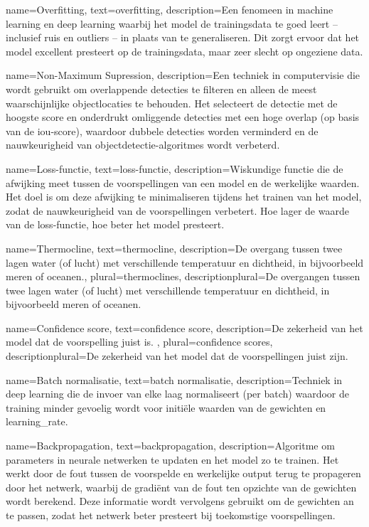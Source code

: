 {
    name={Overfitting},
    text={overfitting},
    description={Een fenomeen in machine learning en deep learning waarbij het model de trainingsdata te goed leert -- inclusief ruis en outliers -- in plaats van te generaliseren. Dit zorgt ervoor dat het model excellent presteert op de trainingsdata, maar zeer slecht op ongeziene data.}
}

{
    name={Non-Maximum Supression},
    description={Een techniek in computervisie die wordt gebruikt om overlappende detecties te filteren en alleen de meest waarschijnlijke objectlocaties te behouden. Het selecteert de detectie met de hoogste score en onderdrukt omliggende detecties met een hoge overlap (op basis van de \gls{iou}-score), waardoor dubbele detecties worden verminderd en de nauwkeurigheid van objectdetectie-algoritmes wordt verbeterd. \autocite{Geron_2023}}
}

{
    name={Loss-functie},
    text={loss-functie},
    description={Wiskundige functie die de afwijking meet tussen de voorspellingen van een model en de werkelijke waarden. Het doel is om deze afwijking te minimaliseren tijdens het trainen van het model, zodat de nauwkeurigheid van de voorspellingen verbetert. Hoe lager de waarde van de loss-functie, hoe beter het model presteert. \autocite{Geron_2023}}
}

{
    name={Thermocline},
    text={thermocline},
    description={De overgang tussen twee lagen water (of lucht) met verschillende temperatuur en dichtheid, in bijvoorbeeld meren of oceanen.},
    plural={thermoclines},
    descriptionplural={De overgangen tussen twee lagen water (of lucht) met verschillende temperatuur en dichtheid, in bijvoorbeeld meren of oceanen.}
}

{
    name={Confidence score},
    text={confidence score},
    description={De zekerheid van het model dat de voorspelling juist is. \autocite{Geron_2023}},
    plural={confidence scores},
    descriptionplural={De zekerheid van het model dat de voorspellingen juist zijn. \autocite{Geron_2023}}    
}

{
    name={Batch normalisatie},
    text={batch normalisatie},
    description={Techniek in deep learning die de invoer van elke laag normaliseert (per batch) waardoor de training minder gevoelig wordt voor initiële waarden van de gewichten en \gls{learning_rate}. \autocite{Geron_2023}}
}

{
    name={Backpropagation},
    text={backpropagation},
    description={Algoritme om parameters in neurale netwerken te updaten en het model zo te trainen. Het werkt door de fout tussen de voorspelde en werkelijke output terug te propageren door het netwerk, waarbij de gradiënt van de fout ten opzichte van de gewichten wordt berekend. Deze informatie wordt vervolgens gebruikt om de gewichten an te passen, zodat het netwerk beter presteert bij toekomstige voorspellingen. \autocite{Geron_2023}}
}
